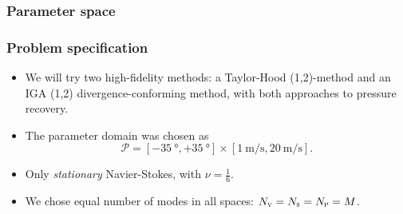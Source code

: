\documentclass{beamer}
\begin{document}
\begin{frame}
  \frametitle{Parameter space}

  \begin{center}
  \end{center}
\end{frame}

\begin{frame}
  \frametitle{Problem specification}

  \begin{itemize}
  \item We will try two high-fidelity methods: a Taylor-Hood (1,2)-method and an IGA (1,2)
    divergence-conforming method, with both approaches to pressure recovery.
  \item The parameter domain was chosen as
    \[
      \mathcal{P} = [-\SI{35}{\degree}, +\SI{35}{\degree}] \times
      [\SI{1}{\meter/\second}, \SI{20}{\meter/\second}].
    \]
  \item Only \emph{stationary} Navier-Stokes, with $\nu = \frac{1}{6}$.
  \item We chose equal number of modes in all spaces: $N_\textsc{v} = N_\textsc{s} = N_\textsc{p} = M$.
  \end{itemize}
\end{frame}
\end{document}
